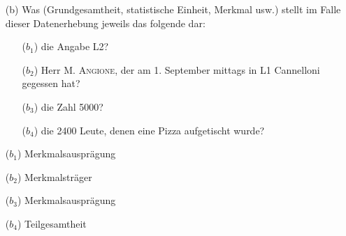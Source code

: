 \begin{task}
    \begin{enumerate}
        \item[(b)] Was (Grundgesamtheit, statistische Einheit, Merkmal usw.) stellt im Falle dieser Datenerhebung jeweils das folgende dar:
        \begin{enumerate}
            \item[($b_1$)] die Angabe L2?
            \item[($b_2$)] Herr \textsc{M. Angione}, der am 1. September mittags in L1 Cannelloni gegessen hat?
            \item[($b_3$)] die Zahl 5000?
            \item[($b_4$)] die 2400 Leute, denen eine Pizza aufgetischt wurde?
        \end{enumerate}
    \end{enumerate}
\end{task}

\begin{enumerate}
    \item[($b_1$)] Merkmalsausprägung
    \item[($b_2$)] Merkmalsträger
    \item[($b_3$)] Merkmalsausprägung
    \item[($b_4$)] Teilgesamtheit
\end{enumerate}
